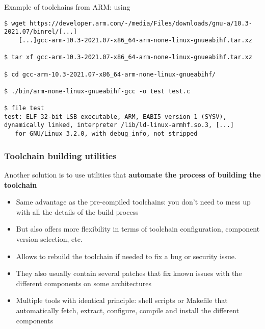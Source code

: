 \begin{frame}[fragile]{Example of toolchains from ARM: using}
  \begin{block}{}
    {\scriptsize
\begin{Verbatim}[breaklines=true, breakanywhere=true]
$ wget https://developer.arm.com/-/media/Files/downloads/gnu-a/10.3-2021.07/binrel/[...]
    [...]gcc-arm-10.3-2021.07-x86_64-arm-none-linux-gnueabihf.tar.xz

$ tar xf gcc-arm-10.3-2021.07-x86_64-arm-none-linux-gnueabihf.tar.xz

$ cd gcc-arm-10.3-2021.07-x86_64-arm-none-linux-gnueabihf/

$ ./bin/arm-none-linux-gnueabihf-gcc -o test test.c

$ file test
test: ELF 32-bit LSB executable, ARM, EABI5 version 1 (SYSV), dynamically linked, interpreter /lib/ld-linux-armhf.so.3, [...]
   for GNU/Linux 3.2.0, with debug_info, not stripped
\end{Verbatim}
    }
  \end{block}
\end{frame}

\begin{frame}
  \frametitle{Toolchain building utilities}
  Another solution is to use utilities that {\bf automate the process of
  building the toolchain}
  \begin{itemize}
  \item Same advantage as the pre-compiled toolchains: you don't need
    to mess up with all the details of the build process
  \item But also offers more flexibility in terms of toolchain
    configuration, component version selection, etc.
  \item Allows to rebuild the toolchain if needed to fix a bug or
    security issue.
  \item They also usually contain several patches that fix known
    issues with the different components on some architectures
  \item Multiple tools with identical principle: shell scripts or
    Makefile that automatically fetch, extract, configure, compile and
    install the different components
\end{itemize}
\end{frame}

